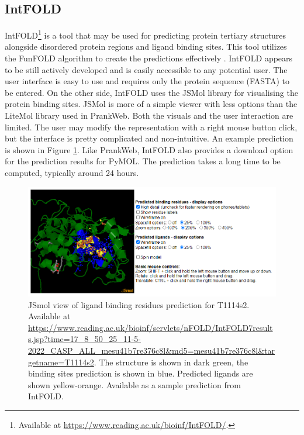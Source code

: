 \subsection{IntFOLD}
\label{subsec:intfold}

IntFOLD\footnote{Available at \url{https://www.reading.ac.uk/bioinf/IntFOLD/}.} is a tool that may be used for predicting protein tertiary structures alongside disordered protein regions and ligand binding sites. This tool utilizes the FunFOLD algorithm to create the predictions effectively \cite{10.1093/nar/gkz322}. IntFOLD appears to be still actively developed and is easily accessible to any potential user. The user interface is easy to use and requires only the protein sequence (FASTA) to be entered. On the other side, IntFOLD uses the JSMol library for visualising the protein binding sites. JSMol is more of a simple viewer with less options than the LiteMol library used in PrankWeb. Both the visuals and the user interaction are limited. The user may modify the representation with a right mouse button click, but the interface is pretty complicated and non-intuitive. An example prediction is shown in Figure \ref{fig:intfold_prediction}. Like PrankWeb, IntFOLD also provides a download option for the prediction results for PyMOL. The prediction takes a long time to be computed, typically around 24 hours.

\begin{figure}
    \centering
    \includegraphics[width=\linewidth]{img/intfold_prediction.png}
    \caption{JSmol view of ligand binding residues prediction for T1114s2.
    Available at \url{https://www.reading.ac.uk/bioinf/servlets/nFOLD/IntFOLD7results.jsp?time=17_8_50_25_11-5-2022_CASP_ALL_mesu41b7re376c8l&md5=mesu41b7re376c8l&targetname=T1114s2}. The structure is shown in dark green, the binding sites prediction is shown in blue. Predicted ligands are shown yellow-orange. Available as a sample prediction from IntFOLD.}
    \label{fig:intfold_prediction}
\end{figure}

